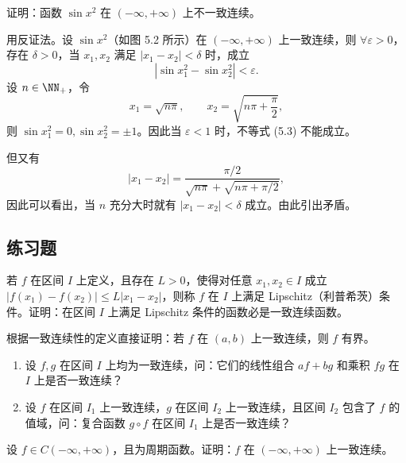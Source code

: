 \begin{xexample}[5.4.8]
证明：函数 $\sin x^2$ 在 $(-\infty,+\infty)$ 上不一致连续。
\end{xexample}
\begin{xproof}
用反证法。设 $\sin x^2$（如图 5.2 所示）在 $(-\infty,+\infty)$ 上一致连续，则 $\forall\varepsilon>0$，存在 $\delta>0$，当 $x_1,x_2$ 满足 $|x_1-x_2|<\delta$ 时，成立
\begin{equation}
  |\sin x_1^2-\sin x_2^2|<\varepsilon.
  \tag{5.3}
  \label{eq:5.3}
\end{equation}
设 $n\in\NN_+$，令
\[
  x_1=\sqrt{n\pi},\qquad x_2=\sqrt{n\pi+\frac\pi2},
\]
则 $\sin x_1^2=0,\sin x_2^2=\pm1$。因此当 $\varepsilon<1$ 时，不等式 (5.3) 不能成立。

但又有
\[
  |x_1-x_2|=\frac{\pi/2}{\sqrt{n\pi}+\sqrt{n\pi+\pi/2}},
\]
因此可以看出，当 $n$ 充分大时就有 $|x_1-x_2|<\delta$ 成立。由此引出矛盾。
\end{xproof}

\subsection{练习题}

\begin{xexercise}[1]
若 $f$ 在区间 $I$ 上定义，且存在 $L>0$，使得对任意 $x_1,x_2\in I$ 成立 $|f(x_1)-f(x_2)|\le L|x_1-x_2|$，则称 $f$ 在 $I$ 上满足 Lipschitz（利普希茨）条件。证明：在区间 $I$ 上满足 Lipschitz 条件的函数必是一致连续函数。
\end{xexercise}

\begin{xexercise}[2]
根据一致连续性的定义直接证明：若 $f$ 在 $(a,b)$ 上一致连续，则 $f$ 有界。
\end{xexercise}

\begin{xexercise}[3]
\begin{enumerate}[label=(\arabic*)]
    \item 设 $f,g$ 在区间 $I$ 上均为一致连续，问：它们的线性组合 $af+bg$ 和乘积 $fg$ 在 $I$ 上是否一致连续？
    \item 设 $f$ 在区间 $I_1$ 上一致连续，$g$ 在区间 $I_2$ 上一致连续，且区间 $I_2$ 包含了 $f$ 的值域，问：复合函数 $g\circ f$ 在区间 $I_1$ 上是否一致连续？
  \end{enumerate}
\end{xexercise}

\begin{xexercise}[4]
设 $f\in C(-\infty,+\infty)$，且为周期函数。证明：$f$ 在 $(-\infty,+\infty)$ 上一致连续。
\end{xexercise}

